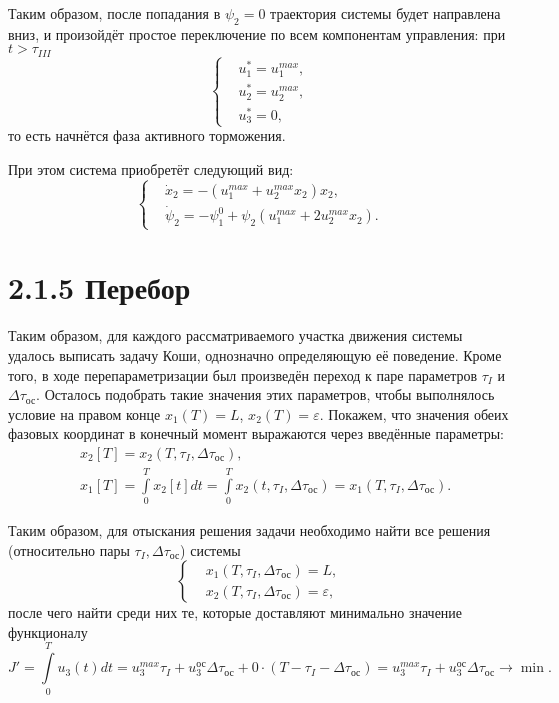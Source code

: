 Таким образом, после попадания в $\psi_2 = 0$ траектория системы будет направлена вниз, и произойдёт простое переключение по всем компонентам управления: при $t > \tau_{III}$
$$
\left\{
    \begin{aligned}
        & u_1^* = u_1^{max}, \\
        & u_2^* = u_2^{max}, \\
        & u_3^* = 0,
    \end{aligned}
\right.
$$
то есть начнётся фаза активного торможения.

При этом система приобретёт следующий вид:
$$
    \left\{
        \begin{aligned}
            & \dot{x}_2 = - (u_1^{max} + u_2^{max} x_2) x_2, \\
            & \dot{\psi}_2 = - \psi_1^0 + \psi_2 (u_1^{max} + 2 u_2^{max} x_2).
        \end{aligned}
    \right.
$$

\section*{2.1.5 Перебор}
Таким образом, для каждого рассматриваемого участка движения системы удалось выписать задачу Коши, однозначно определяющую её поведение. Кроме того, в ходе перепараметризации был произведён переход к паре параметров $\tau_{I}$ и $\Delta \tau_{\text{ос}}$. Осталось подобрать такие значения этих параметров, чтобы выполнялось условие на правом конце $x_1(T) = L$, $x_2(T) = \varepsilon$. Покажем, что значения обеих фазовых координат в конечный момент выражаются через введённые параметры:
$$
    \begin{aligned}
        & x_2 [T] = x_2(T, \tau_{I}, \Delta \tau_{\text{ос}}), \\
        & x_1 [T] = \int\limits_0^T x_2[t] dt = \int\limits_0^T x_2(t, \tau_{I}, \Delta \tau_{\text{ос}}) = x_1(T, \tau_{I}, \Delta \tau_{\text{ос}}).
    \end{aligned}
$$

Таким образом, для отыскания решения задачи необходимо найти все решения (относительно пары $\tau_{I}, \Delta \tau_{\text{ос}}$) системы
$$
\left\{
    \begin{aligned}
        & x_1(T, \tau_{I}, \Delta \tau_{\text{ос}}) = L, \\
        & x_2(T, \tau_{I}, \Delta \tau_{\text{ос}}) = \varepsilon,
    \end{aligned}
\right.
$$
после чего найти среди них те, которые доставляют минимально значение функционалу
$$
    J' = \int\limits_0^T u_3(t) dt = u_3^{max} \tau_{I} + u_3^{\text{ос}} \Delta\tau_{\text{ос}} + 0 \cdot (T - \tau_{I} - \Delta\tau_{\text{ос}}) = u_3^{max} \tau_{I} + u_3^{\text{ос}} \Delta\tau_{\text{ос}} \to \min.
$$

